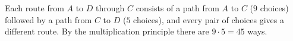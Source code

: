 Each route from $A$ to $D$ through $C$ consists of a path from $A$ to $C$ ($9$ choices) followed by a path from $C$ to $D$ ($5$ choices), and every pair of choices gives a different route. By the multiplication principle there are $9\cdot5=\boxed{45}$ ways.
